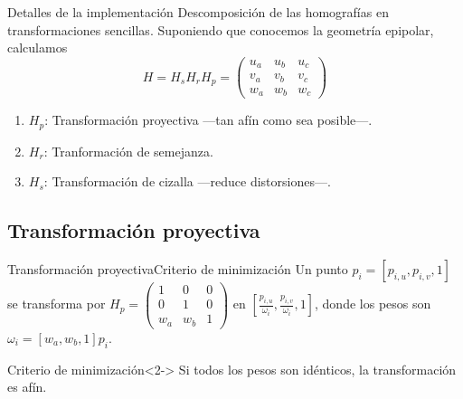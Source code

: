 \documentclass[14pt,spanish]{beamer}
\begin{document}
    \begin{frame}{Detalles de la implementación}{}
      Descomposición de las homografías en transformaciones sencillas.
      Suponiendo que conocemos la geometría epipolar, calculamos
      \[
      H = H_s H_r H_p =
      \begin{pmatrix}
          u_a & u_b & u_c \\
          v_a & v_b & v_c \\
          w_a & w_b & w_c
      \end{pmatrix}
      \]

        \begin{enumerate}
            \item<2-> $H_p$: Transformación proyectiva ---tan afín como sea posible---.
            \item<3-> $H_r$: Tranformación de semejanza.
            \item<4-> $H_s$: Transformación de cizalla ---reduce distorsiones---.
        \end{enumerate}
    \end{frame}

    \subsection{Transformación proyectiva}


      \begin{frame}{Transformación proyectiva}{Criterio de minimización}
          Un punto $p_i = [p_{i,u}, p_{i,v}, 1]$ se transforma por
          $
          H_p =
          \begin{pmatrix}
              1 & 0 & 0 \\
              0 & 1 & 0 \\
              w_a & w_b & 1
          \end{pmatrix}
          $
          en $[\frac{p_{i,u}}{\omega_i}, \frac{p_{i,v}}{\omega_i}, 1]$, donde los pesos son $\omega_i = [w_a, w_b, 1]p_i$.
          \\
          \begin{alertblock}{Criterio de minimización}<2->
              Si todos los pesos son idénticos, la transformación es afín.
          \end{alertblock}
      \end{frame}
\end{document}
